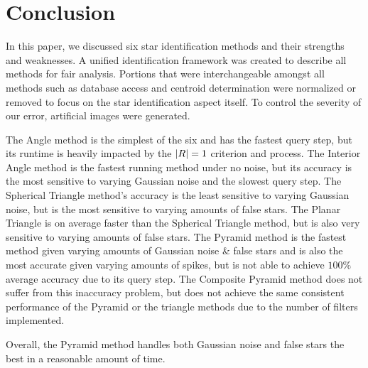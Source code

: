 \section{Conclusion}\label{sec:conclusion}
In this paper, we discussed six star identification methods and their strengths and weaknesses.
A unified identification framework was created to describe all methods for fair analysis.
Portions that were interchangeable amongst all methods such as database access and centroid determination were
normalized or removed to focus on the star identification aspect itself.
To control the severity of our error, artificial images were generated.

The Angle method is the simplest of the six and has the fastest query step, but its runtime is heavily impacted by
the $\left| R \right| = 1$ criterion and  process.
The Interior Angle method is the fastest running method under no noise, but its accuracy is the most sensitive to
varying Gaussian noise and the slowest query step.
The Spherical Triangle method's accuracy is the least sensitive to varying Gaussian noise, but is the most sensitive
to varying amounts of false stars.
The Planar Triangle is on average faster than the Spherical Triangle method, but is also very sensitive to varying
amounts of false stars.
The Pyramid method is the fastest method given varying amounts of Gaussian noise \& false stars and is also the most
accurate given varying amounts of spikes, but is not able to achieve $100\%$ average accuracy due to its query step.
The Composite Pyramid method does not suffer from this inaccuracy problem, but does not achieve the same consistent
performance of the Pyramid or the triangle methods due to the number of filters implemented.

Overall, the Pyramid method handles both Gaussian noise and false stars the best in a reasonable amount of time.
